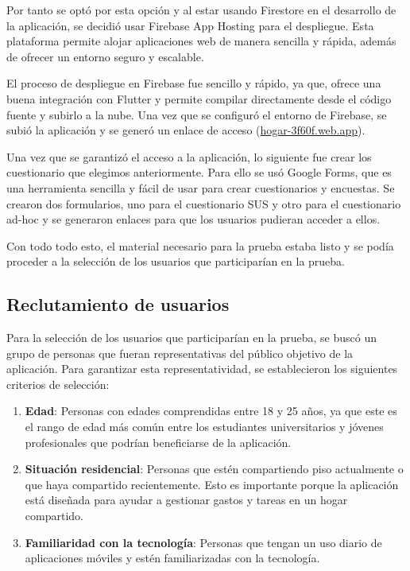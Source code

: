 Por tanto se optó por esta opción y al estar usando Firestore en el desarrollo de la aplicación,
se decidió usar Firebase App Hosting para el despliegue. Esta plataforma permite alojar aplicaciones web de manera sencilla y rápida, además de ofrecer un entorno seguro y escalable.

El proceso de despliegue en Firebase fue sencillo y rápido, ya que, ofrece una buena integración con Flutter y permite compilar directamente desde el código fuente y subirlo a la nube.
Una vez que se configuró el entorno de Firebase, se subió la aplicación y se generó un enlace de acceso (\href{https://hogar-3f60f.web.app/}{hogar-3f60f.web.app}).
 

Una vez que se garantizó el acceso a la aplicación, lo siguiente fue crear los cuestionario que elegimos anteriormente. 
Para ello se usó Google Forms, que es una herramienta sencilla y fácil de usar para crear cuestionarios y encuestas.
Se crearon dos formularios, uno para el cuestionario SUS y otro para el cuestionario ad-hoc y se generaron enlaces para que los usuarios pudieran acceder a ellos.

Con todo todo esto, el material necesario para la prueba estaba listo y se podía proceder a la selección de los usuarios que participarían en la prueba.

\subsection{Reclutamiento de usuarios}

Para la selección de los usuarios que participarían en la prueba, se buscó un grupo de personas que fueran representativas del público objetivo de la aplicación.
Para garantizar esta representatividad, se establecieron los siguientes criterios de selección:

\begin{enumerate}
    \item \textbf{Edad}: Personas con edades comprendidas entre 18 y 25 años, ya que este es el rango de edad más común entre los estudiantes universitarios y jóvenes profesionales que podrían beneficiarse de la aplicación.
    \item \textbf{Situación residencial}: Personas que estén compartiendo piso actualmente o que haya compartido recientemente. Esto es importante porque la aplicación está diseñada para ayudar a gestionar gastos y tareas en un hogar compartido.
    \item \textbf{Familiaridad con la tecnología}: Personas que tengan un uso diario de aplicaciones móviles y estén familiarizadas con la tecnología.
\end{enumerate}

